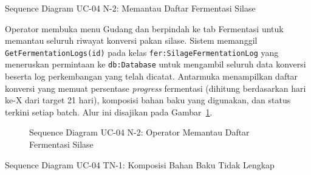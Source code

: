 \newpage

\item{Sequence Diagram UC-04 N-2: Memantau Daftar Fermentasi Silase}

Operator membuka menu Gudang dan berpindah ke tab Fermentasi untuk
memantau seluruh riwayat konversi pakan silase. Sistem memanggil
\texttt{GetFermentationLogs(id)} pada kelas \texttt{fer:SilageFermentationLog}
yang meneruskan permintaan ke \texttt{db:Database} untuk mengambil
seluruh data konversi beserta log perkembangan yang telah dicatat.
Antarmuka menampilkan daftar konversi yang memuat persentase
\textit{progress} fermentasi (dihitung berdasarkan hari ke-X dari target
21 hari), komposisi bahan baku yang digunakan, dan status terkini setiap
batch. Alur ini disajikan pada Gambar~\ref{fig:seq_uc04_n2_pantau}.

\begin{figure}[htbp]
\centering
{}
\caption{Sequence Diagram UC-04 N-2: Operator Memantau Daftar Fermentasi Silase}
\label{fig:seq_uc04_n2_pantau}
\end{figure}

\newpage

\item{Sequence Diagram UC-04 TN-1: Komposisi Bahan Baku Tidak Lengkap}

